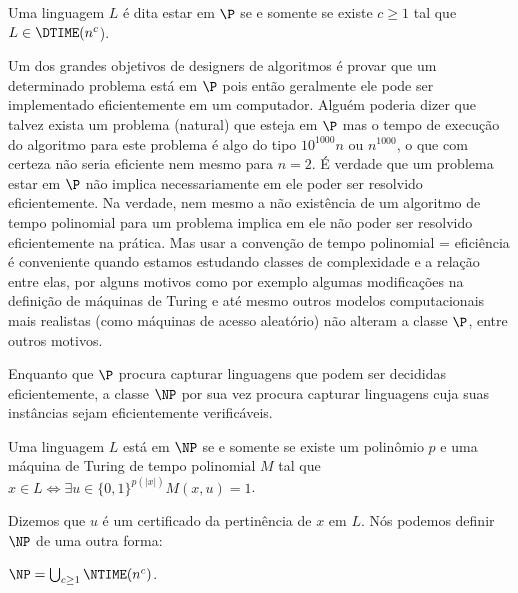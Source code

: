 \begin{defi} [A classe $\P$]

Uma linguagem $L$ é dita estar em $\P$ se e somente se existe $c \geq 1$ tal que $L \in \text{\DTIME}(n^{c}$).

\end{defi}

Um dos grandes objetivos de designers de algoritmos é provar que um determinado problema está em $\P$ pois então geralmente ele pode ser implementado eficientemente em um computador. Alguém poderia dizer que talvez exista um problema (natural) que esteja em $\P$ mas o tempo de execução do algoritmo para este problema é algo do tipo $10^{1000}n$ ou $n^{1000}$, o que com certeza não seria eficiente nem mesmo para $n = 2$. É verdade que um problema estar em $\P$ não implica necessariamente em ele poder ser resolvido eficientemente. Na verdade, nem mesmo a não existência de um algoritmo de tempo polinomial para um problema implica em ele não poder ser resolvido eficientemente na prática. Mas usar a convenção de tempo polinomial = eficiência é conveniente quando estamos estudando classes de complexidade e a relação entre elas, por alguns motivos como por exemplo algumas modificações na definição de máquinas de Turing e até mesmo outros modelos computacionais mais realistas (como máquinas de acesso aleatório) não alteram a classe $\P$, entre outros motivos.


Enquanto que $\P$ procura capturar linguagens que podem ser decididas eficientemente, a classe $\NP$ por sua vez procura capturar linguagens cuja suas instâncias sejam eficientemente verificáveis.

\begin{defi} [A classe $\NP$]

Uma linguagem $L$ está em $\NP$ se e somente se existe um polinômio $p$ e uma máquina de Turing de tempo polinomial $M$ tal que $x \in L \iff \exists u \in \{0, 1\}^{p(\lvert x \rvert)} M(x, u) = 1$. 

\end{defi}

Dizemos que $u$ é um certificado da pertinência de $x$ em $L$. Nós podemos definir $\NP$ de uma outra forma:

\begin{defi}

$\NP = \bigcup_{c \geq 1} \NTIME(n^{c})$.

\end{defi}

